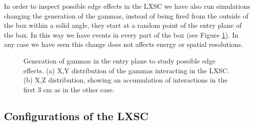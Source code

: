 In order to inspect possible edge effects in the LXSC we have also run simulations changing the generation of the gammas, instead of being fired from the outside of the box within a solid angle, they start at a random point of the entry plane of the box. In this way we have events in every part of the box (see Figure \ref{fig.distNewgen}). In any case we have seen this change does not affects energy or spatial resolutions. 

\begin{figure}[!htb]
        \begin{center}
                \caption{\label{fig.distNewgen} Generation of gammas in the entry plane to study possible edge effects. (a) X,Y distribution of the gammas interacting in the LXSC. (b) X,Z distribution, showing an accumulation of interactions in the first 3 cm as in the other case.}
        \end{center}
\end{figure}


\subsection{Configurations of the LXSC}

